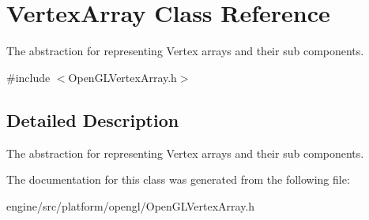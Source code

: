 \hypertarget{classVertexArray}{}\section{Vertex\+Array Class Reference}
\label{classVertexArray}


The abstraction for representing Vertex arrays and their sub components.  




{\ttfamily \#include $<$Open\+G\+L\+Vertex\+Array.\+h$>$}



\subsection{Detailed Description}
The abstraction for representing Vertex arrays and their sub components. 

The documentation for this class was generated from the following file\+:\begin{DoxyCompactItemize}
\item 
engine/src/platform/opengl/Open\+G\+L\+Vertex\+Array.\+h\end{DoxyCompactItemize}
